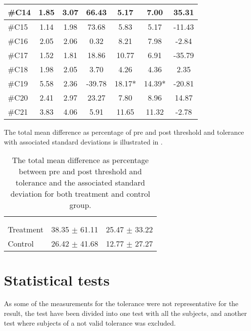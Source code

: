 \begin{longtable} {l|c|c|c|c|c|c}
\#C14 & 1.85 & 3.07 & 	66.43	 & 5.17 & 7.00 & 35.31 \\ \hline
\#C15 & 1.14 & 1.98 & 	73.68 & 5.83 & 5.17 & -11.43 \\ \hline
\#C16 & 2.05 & 2.06 & 	0.32 & 8.21 & 7.98 & -2.84 \\ \hline
\#C17 & 1.52 & 1.81 &	18.86 & 10.77 & 6.91 & -35.79 \\ \hline
\#C18 & 1.98 & 2.05 & 	3.70 & 4.26  &  4.36 & 2.35 \\ \hline
\#C19 & 5.58 & 2.36 & 	-39.78 & 18.17* & 14.39* & -20.81 \\ \hline
\#C20 & 2.41 & 2.97 &  23.27 & 7.80 &  8.96 & 14.87\\ \hline
\#C21 & 3.83 & 4.06 & 5.91  & 11.65 & 11.32 & -2.78 \\ \hline
\end{longtable}


The total mean difference as percentage of pre and post threshold and tolerance with associated standard deviations is illustrated in .


\begin{longtable} {l|c|c}
	\caption{The total mean difference as percentage between pre and post threshold and tolerance and the associated standard deviation for both treatment and control group.}
	\label{tab:Total} \\
\cellcolor[HTML]{C0C0C0} {} & 
\cellcolor[HTML]{C0C0C0}{\textbf{Threshold}} &  \cellcolor[HTML]{C0C0C0}{\textbf{Tolerance}}  	\\  \rule{0pt}{3ex} 		
\cellcolor[HTML]{C0C0C0}{} &
 \cellcolor[HTML]{C0C0C0}{Difference [\%]} &  \cellcolor[HTML]{C0C0C0}{Difference [\%]} \\ \hline
Treatment & 38.35 $\pm$ 61.11 & 25.47 $\pm$ 33.22 \\ \hline
Control & 26.42 $\pm$ 41.68 & 12.77 $\pm$ 27.27 \\ \hline
\end{longtable}
\vspace{-.5cm}


\section{Statistical tests}
As some of the measurements for the tolerance were not representative for the result, the test have been divided into one test with all the subjects, and another test where subjects of a not valid tolerance was excluded.


